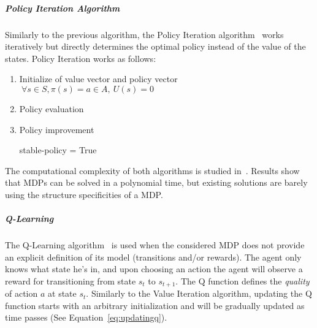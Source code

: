 \subparagraph{Policy Iteration Algorithm}
Similarly to the previous algorithm, the Policy Iteration algorithm~\cite{policyiteration} works iteratively but directly determines the optimal policy instead of the value of the states.
Policy Iteration works as follows:
\begin{enumerate}
    \item Initialize of value vector and policy vector $~\forall s\in S,\pi(s)=a\in A,~U(s)=0$
    \item Policy evaluation
        \begin{algorithm}
        \end{algorithm}
    \item Policy improvement 
    \begin{algorithm}
        stable-policy = True
    \end{algorithm}
\end{enumerate}


The computational complexity of both algorithms is studied in~\cite{mdpcomplexity}.
Results show that MDPs can be solved in a polynomial time, but existing solutions are barely using the structure specificities of a MDP.

\subparagraph{Q-Learning}
The Q-Learning algorithm~\cite{qlearning} is used when the considered MDP does not provide an explicit definition of its model (\ie transitions and/or rewards).
The agent only knows what state he's in, and upon choosing an action the agent will observe a reward for transitioning from state $s_t$ to $s_{t+1}$.
The Q function defines the \textit{quality} of action $a$ at state $s_t$.
Similarly to the Value Iteration algorithm, updating the Q function starts with an arbitrary initialization and will be gradually updated as time passes (See Equation~\eqref{eq:updatingq}).


